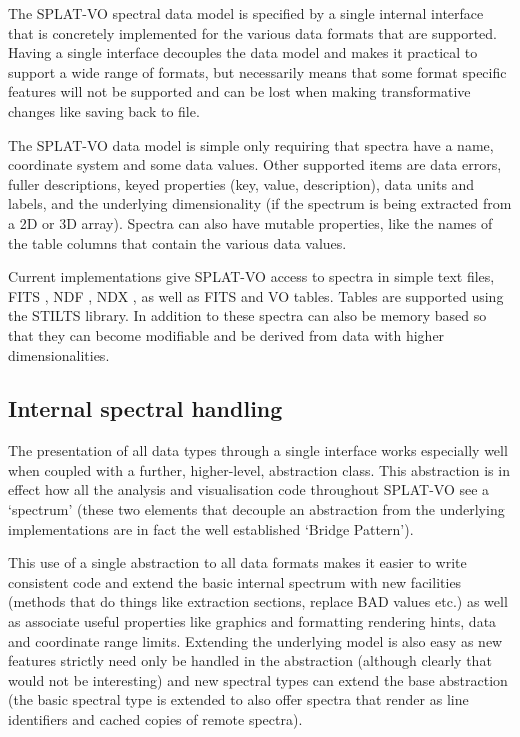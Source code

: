 \documentclass[final,authoryear,5p,times,twocolumn]{elsarticle}
\begin{document}
The SPLAT-VO spectral data model is specified by a single internal interface
that is concretely implemented for the various data formats that are
supported. Having a single interface decouples the data model and makes it
practical to support a wide range of formats, but necessarily means that some
format specific features will not be supported and can be lost when making
transformative changes like saving back to file.

The SPLAT-VO data model is simple only requiring that spectra have a name,
coordinate system and some data values. Other supported items are data errors,
fuller descriptions, keyed properties (key, value, description), data units
and labels, and the underlying dimensionality (if the spectrum is being
extracted from a 2D or 3D array). Spectra can also have mutable properties,
like the names of the table columns that contain the various data values.

Current implementations give SPLAT-VO access to spectra in simple text
files, FITS \citep{2010A&A...524A..42P}, NDF \citep{ndfjenness}, NDX
\citep{2003ASPC..295..221G}, as well as FITS and VO tables. Tables are
supported using the STILTS
\citep[][]{2006ASPC..351..666T} library. In addition to
these spectra can also be memory based so that they can become
modifiable and be derived from data with higher dimensionalities.

\subsection{Internal spectral handling}

The presentation of all data types through a single interface works especially
well when coupled with a further, higher-level, abstraction class. This
abstraction is in effect how all the analysis and visualisation code
throughout SPLAT-VO see a `spectrum' (these two elements that decouple an
abstraction from the underlying implementations are in fact the well
established `Bridge Pattern').

This use of a single abstraction to all data formats makes it easier to write
consistent code and extend the basic internal spectrum with new facilities
(methods that do things like extraction sections, replace BAD values etc.) as
well as associate useful properties like graphics and formatting rendering
hints, data and coordinate range limits. Extending the underlying model is
also easy as new features strictly need only be handled in the abstraction
(although clearly that would not be interesting) and new spectral types can
extend the base abstraction (the basic spectral type is extended to also offer
spectra that render as line identifiers and cached copies of remote spectra).
\end{document}
